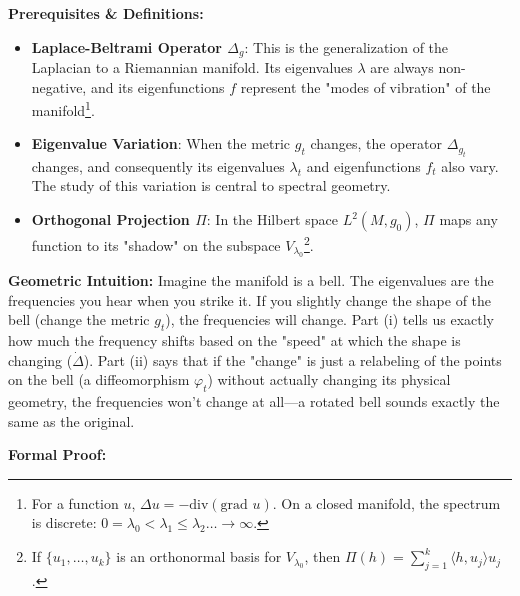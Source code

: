 \begin{solution}
\textbf{Prerequisites \& Definitions:}
\begin{itemize}
    \item \textbf{Laplace-Beltrami Operator $\Delta_g$}: This is the generalization of the Laplacian to a Riemannian manifold. Its eigenvalues $\lambda$ are always non-negative, and its eigenfunctions $f$ represent the "modes of vibration" of the manifold\footnote{For a function $u$, $\Delta u = -\text{div}(\text{grad } u)$. On a closed manifold, the spectrum is discrete: $0 = \lambda_0 < \lambda_1 \le \lambda_2 \dots \to \infty$.}.
    \item \textbf{Eigenvalue Variation}: When the metric $g_t$ changes, the operator $\Delta_{g_t}$ changes, and consequently its eigenvalues $\lambda_t$ and eigenfunctions $f_t$ also vary. The study of this variation is central to spectral geometry.
    \item \textbf{Orthogonal Projection $\Pi$}: In the Hilbert space $L^2(M, g_0)$, $\Pi$ maps any function to its "shadow" on the subspace $V_{\lambda_0}$\footnote{If $\{u_1, \dots, u_k\}$ is an orthonormal basis for $V_{\lambda_0}$, then $\Pi(h) = \sum_{j=1}^k \langle h, u_j \rangle u_j$.}.
\end{itemize}

\textbf{Geometric Intuition:}
Imagine the manifold is a bell. The eigenvalues are the frequencies you hear when you strike it. If you slightly change the shape of the bell (change the metric $g_t$), the frequencies will change. Part (i) tells us exactly how much the frequency shifts based on the "speed" at which the shape is changing ($\dot{\Delta}$). Part (ii) says that if the "change" is just a relabeling of the points on the bell (a diffeomorphism $\varphi_t$) without actually changing its physical geometry, the frequencies won't change at all—a rotated bell sounds exactly the same as the original.

\textbf{Formal Proof:}


\end{solution}
